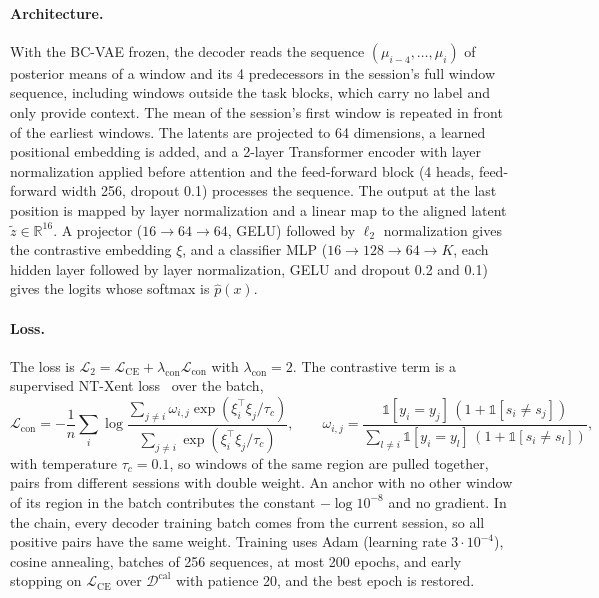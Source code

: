 \documentclass{article}
\begin{document}
\paragraph{Architecture.} With the BC-VAE frozen, the decoder reads the sequence $(\mu_{i-4},\ldots,\mu_i)$ of posterior means of a window and its 4 predecessors in the session's full window sequence, including windows outside the task blocks, which carry no label and only provide context. The mean of the session's first window is repeated in front of the earliest windows. The latents are projected to 64 dimensions, a learned positional embedding is added, and a 2-layer Transformer encoder with layer normalization applied before attention and the feed-forward block (4 heads, feed-forward width 256, dropout 0.1) processes the sequence. The output at the last position is mapped by layer normalization and a linear map to the aligned latent $\tilde z\in\mathbb{R}^{16}$. A projector ($16\to64\to64$, GELU) followed by $\ell_2$ normalization gives the contrastive embedding $\xi$, and a classifier MLP ($16\to128\to64\to K$, each hidden layer followed by layer normalization, GELU and dropout 0.2 and 0.1) gives the logits whose softmax is $\hat p(x)$.

\paragraph{Loss.} The loss is $\mathcal{L}_2=\mathcal{L}_{\mathrm{CE}}+\lambda_{\mathrm{con}}\mathcal{L}_{\mathrm{con}}$ with $\lambda_{\mathrm{con}}=2$. The contrastive term is a supervised NT-Xent loss~\cite{schneider2023a} over the batch,
\begin{equation}
  \mathcal{L}_{\mathrm{con}}=-\frac1n\sum_{i}\log\frac{\sum_{j\ne i}\omega_{i,j}\exp(\xi_i^\top \xi_j/\tau_c)}{\sum_{j\ne i}\exp(\xi_i^\top \xi_j/\tau_c)},\qquad \omega_{i,j}=\frac{\mathbb{1}[y_i=y_j]\,(1+\mathbb{1}[s_i\ne s_j])}{\sum_{l\ne i}\mathbb{1}[y_i=y_l]\,(1+\mathbb{1}[s_i\ne s_l])},
\end{equation}
with temperature $\tau_c=0.1$, so windows of the same region are pulled together, pairs from different sessions with double weight. An anchor with no other window of its region in the batch contributes the constant $-\log 10^{-8}$ and no gradient. In the chain, every decoder training batch comes from the current session, so all positive pairs have the same weight. Training uses Adam (learning rate $3\cdot10^{-4}$), cosine annealing, batches of 256 sequences, at most 200 epochs, and early stopping on $\mathcal{L}_{\mathrm{CE}}$ over $\mathcal{D}^{\mathrm{cal}}$ with patience 20, and the best epoch is restored.
\end{document}
